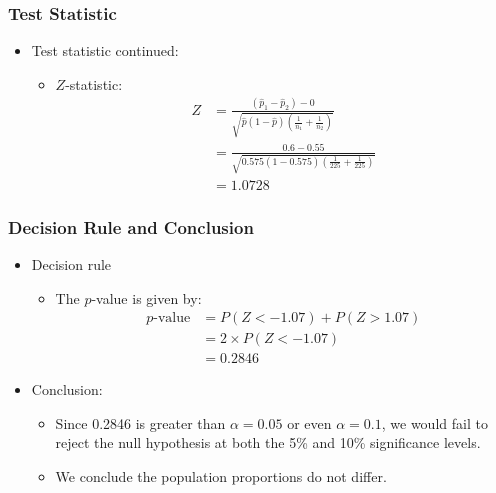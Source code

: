 \documentclass[12pt]{beamer}
\begin{document}
	\begin{frame}
		\frametitle{Test Statistic}
		
		\begin{itemize}[label={\color{blue}$\blacktriangleright$}]
			\item Test statistic continued:
			\begin{itemize}[label={\color{blue}$\blacktriangleright$}]
				\item $Z$-statistic:
				\[
				\begin{aligned}
					Z &= \frac{(\hat{p}_1 - \hat{p}_2) - 0}{\sqrt{\hat{p}(1 - \hat{p}) \left(\frac{1}{n_1} + \frac{1}{n_2}\right)}} \\
					&= \frac{0.6 - 0.55}{\sqrt{0.575(1 - 0.575) \left(\frac{1}{225} + \frac{1}{225}\right)}} \\
					&= 1.0728
				\end{aligned}
				\]
			\end{itemize}
		\end{itemize}
		
	\end{frame}
\begin{frame}
	\frametitle{Decision Rule and Conclusion}
	
	\begin{itemize}[label={\color{blue}$\blacktriangleright$}]
		\item Decision rule
		\begin{itemize}[label={\color{blue}$\blacktriangleright$}]
			\item The $p$-value is given by:
			\[
			\begin{aligned}
				p\text{-value} &= P(Z < -1.07) + P(Z > 1.07) \\
				&= 2 \times P(Z < -1.07) \\
				&= 0.2846
			\end{aligned}
			\]
		\end{itemize}
		
		\item Conclusion:
		\begin{itemize}[label={\color{blue}$\blacktriangleright$}]
			\item Since 0.2846 is greater than $\alpha = 0.05$ or even $\alpha = 0.1$, we would fail to reject the null hypothesis at both the 5\% and 10\% significance levels.
			\item We conclude the population proportions do not differ.
		\end{itemize}
	\end{itemize}
	
\end{frame}
\end{document}
